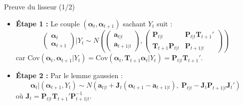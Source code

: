 \documentclass[11pt,aspectratio=169]{beamer}
\newcommand{\Cov}{\mathrm{Cov}}
\begin{document}
\begin{frame}{Preuve du lisseur (1/2)}

\begin{itemize}

\item \textbf{Étape 1 :} Le couple $(\bm{\alpha}_t, \bm{\alpha}_{t+1})$ sachant $Y_t$ suit :
  \[
  \begin{pmatrix} \bm{\alpha}_t \\ \bm{\alpha}_{t+1} \end{pmatrix} \bigg| Y_t \sim N\!\left( \begin{pmatrix} \bm{a}_{t|t} \\ \bm{a}_{t+1|t} \end{pmatrix}, \begin{pmatrix} \bm{P}_{t|t} & \bm{P}_{t|t}\bm{T}_{t+1}' \\ \bm{T}_{t+1}\bm{P}_{t|t} & \bm{P}_{t+1|t} \end{pmatrix} \right)
  \]
  car $\Cov(\bm{\alpha}_t, \bm{\alpha}_{t+1}|Y_t) = \Cov(\bm{\alpha}_t, \bm{T}_{t+1}\bm{\alpha}_t|Y_t) = \bm{P}_{t|t}\bm{T}_{t+1}'$.\newline

\item \textbf{Étape 2 :} Par le lemme gaussien :
  \[
  \bm{\alpha}_t | (\bm{\alpha}_{t+1}, Y_t) \sim N\!\left( \bm{a}_{t|t} + \bm{J}_t (\bm{\alpha}_{t+1} - \bm{a}_{t+1|t}), \; \bm{P}_{t|t} - \bm{J}_t \bm{P}_{t+1|t} \bm{J}_t' \right)
  \]
  où $\bm{J}_t = \bm{P}_{t|t} \bm{T}_{t+1}' \bm{P}_{t+1|t}^{-1}$.

\end{itemize}

\end{frame}
\end{document}
